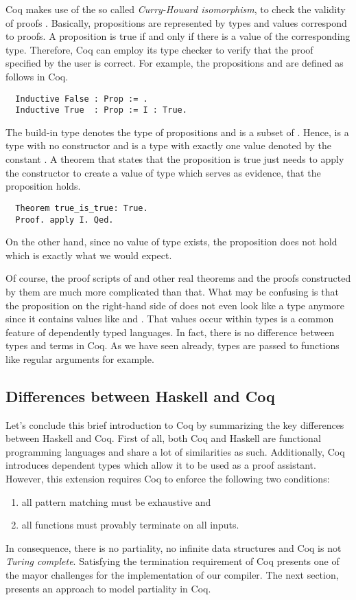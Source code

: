 Coq makes use of the so called \textit{Curry-Howard isomorphism}, to check the validity of proofs \cite[p.~1]{CoqDevTeam:2018}.
Basically, propositions are represented by types and values correspond to proofs.
A proposition is true if and only if there is a value of the corresponding type.
Therefore, Coq can employ its type checker to verify that the proof specified by the user is correct.
For example, the propositions  and  are defined as follows in Coq.
\begin{verbatim}
  Inductive False : Prop := .
  Inductive True  : Prop := I : True.
\end{verbatim}
The build-in type  denotes the type of propositions and is a subset of .
Hence,  is a type with no constructor and  is a type with exactly one value denoted by the constant .
A theorem that states that the proposition  is true just needs to apply the constructor  to create a value of type  which serves as evidence, that the proposition holds.
\begin{verbatim}
  Theorem true_is_true: True.
  Proof. apply I. Qed.
\end{verbatim}
On the other hand, since no value of type  exists, the proposition  does not hold which is exactly what we would expect.

Of course, the proof scripts of  and other real theorems and the proofs constructed by them are much more complicated than that.
What may be confusing is that the proposition on the right-hand side of  does not even look like a type anymore since it contains values like  and .
That values occur within types is a common feature of dependently typed languages.
In fact, there is no difference between types and terms in Coq.
As we have seen already, types are passed to functions like regular arguments for example.

\subsection{Differences between Haskell and Coq} \label{sec:preliminaries:coq:summary}
Let's conclude this brief introduction to Coq by summarizing the key differences between Haskell and Coq.
First of all, both Coq and Haskell are functional programming languages and share a lot of similarities as such.
Additionally, Coq introduces dependent types which allow it to be used as a proof assistant.
However, this extension requires Coq to enforce the following two conditions:
\begin{enumerate}
  \item all pattern matching must be exhaustive and
  \item all functions must provably terminate on all inputs.
\end{enumerate}
In consequence, there is no partiality, no infinite data structures and Coq is not \textit{Turing complete}.
Satisfying the termination requirement of Coq presents one of the mayor challenges for the implementation of our compiler.
The next section, presents an approach to model partiality in Coq.
